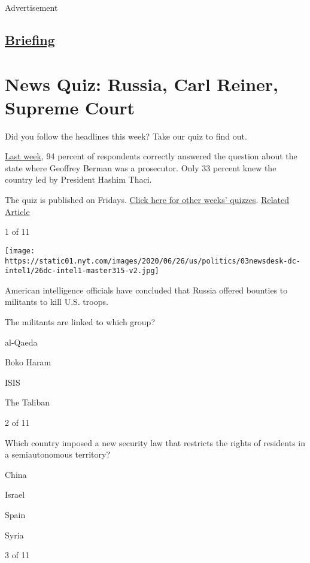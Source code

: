 Advertisement

\hypertarget{-briefing-}{%
\subsection{\texorpdfstring{
\href{/interactive/2018/briefing/global-morning-briefing-newsletter-signup.html}{Briefing}
}{ Briefing }}\label{-briefing-}}

\hypertarget{news-quiz-russia-carl-reiner-supreme-court}{%
\section{News Quiz: Russia, Carl Reiner, Supreme
Court}\label{news-quiz-russia-carl-reiner-supreme-court}}

Did you follow the headlines this week? Take our quiz to find out.

\href{https://www.nytimes.com/interactive/2020/06/26/briefing/geoffrey-berman-coronavirus-statues-news-quiz.html}{Last
week}, 94 percent of respondents correctly answered the question about
the state where Geoffrey Berman was a prosecutor. Only 33 percent knew
the country led by President Hashim Thaci.

The quiz is published on Fridays.
\href{https://www.nytimes.com/spotlight/news-quiz}{Click here for other
weeks' quizzes}.
\href{https://www.nytimes.com/interactive/2020/06/26/briefing/geoffrey-berman-coronavirus-statues-news-quiz.html}{Related
Article}

1 of 11

\texttt{[image: https://static01.nyt.com/images/2020/06/26/us/politics/03newsdesk-dc-intel1/26dc-intel1-master315-v2.jpg]}

American intelligence officials have concluded that Russia offered
bounties to militants to kill U.S. troops.

The militants are linked to which group?

al-Qaeda

Boko Haram

ISIS

The Taliban

2 of 11

Which country imposed a new security law that restricts the rights of
residents in a semiautonomous territory?

China

Israel

Spain

Syria

3 of 11

